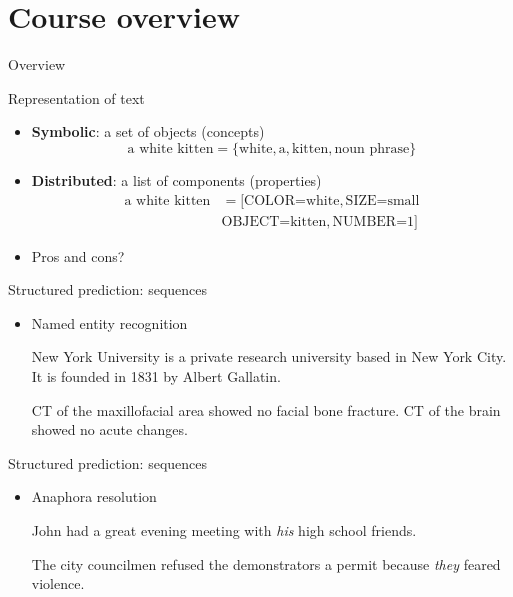 \documentclass[usenames,dvipsnames,notes]{beamer}
\begin{document}
\section{Course overview}
\begin{frame}
    {Overview}
\end{frame}

\begin{frame}
    {Representation of text}
    \begin{itemize}
        \itemsep2em
        \item[] \textbf{Symbolic}: a set of objects (concepts)
            $$
            \text{a white kitten} = \{\text{white}, \text{a}, \text{kitten}, \text{noun phrase}\}
            $$
        \item[] \textbf{Distributed}: a list of components (properties)
            \begin{align*}
                \text{a white kitten} &= [\text{COLOR=white}, \text{SIZE=small} \\
                &\text{OBJECT=kitten}, \text{NUMBER=1}]
            \end{align*}
        \item[] Pros and cons?
    \end{itemize}
\end{frame}

\begin{frame}
    {Structured prediction: sequences}
    \begin{itemize}
        \item Named entity recognition\\
        {
            New York University is a private research university based in New York City. It is founded in 1831 by Albert Gallatin.\par
            CT of the maxillofacial area showed no facial bone fracture. CT of the brain showed no acute changes.\par
        }
    \end{itemize}
\end{frame}

\begin{frame}
    {Structured prediction: sequences}
    \begin{itemize}
        \item Anaphora resolution\\
            {
                John had a great evening meeting with \emph{his} high school friends.\par
                The city councilmen refused the demonstrators a permit because \emph{they} feared violence.\par
            }
    \end{itemize}
\end{frame}
\end{document}
